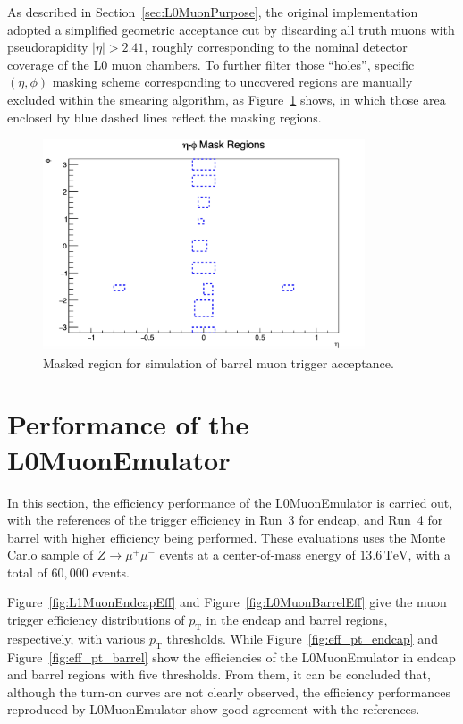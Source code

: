 As described in Section~\ref{sec:L0MuonPurpose}, the original implementation adopted a simplified geometric acceptance cut by discarding all truth muons with pseudorapidity $|\eta| > 2.41$, roughly corresponding to the nominal detector coverage of the L0 muon chambers. To further filter those ``holes'', specific $(\eta, \phi)$ masking scheme corresponding to uncovered regions are manually excluded within the smearing algorithm, as Figure~\ref{fig:masking} shows, in which those area enclosed by blue dashed lines reflect the masking regions.

\begin{figure}[htbp]
  \centering
  \includegraphics[width=0.85\textwidth]{figs/chapter4/masked_eta_phi_map.png}
  \caption{Masked region for simulation of barrel muon trigger acceptance.}
  \label{fig:masking}
\end{figure}

\section{Performance of the L0MuonEmulator} \label{sec:L0MuonEmulatorPerformance}
In this section, the efficiency performance of the L0MuonEmulator is carried out, with the references of the trigger efficiency in Run~3 for endcap, and Run~4 for barrel with higher efficiency being performed. These evaluations uses the Monte Carlo sample of $Z \to \mu^+ \mu^-$ events at a center-of-mass energy of $13.6\,\mathrm{TeV}$, with a total of $60{,}000$ events.

Figure~\ref{fig:L1MuonEndcapEff} and Figure~\ref{fig:L0MuonBarrelEff} give the muon trigger efficiency distributions of $p_\mathrm{T}$ in the endcap and barrel regions, respectively, with various $p_\mathrm{T}$ thresholds. While Figure~\ref{fig:eff_pt_endcap} and Figure~\ref{fig:eff_pt_barrel} show the efficiencies of the L0MuonEmulator in endcap and barrel regions with five thresholds. From them, it can be concluded that, although the turn-on curves are not clearly observed, the efficiency performances reproduced by L0MuonEmulator show good agreement with the references.

